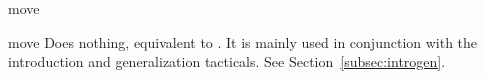 \begin{tactic}[move]{move}
  \begin{tsyntax}[empty]{move}
     Does nothing, equivalent to . It is mainly
     used in conjunction with the introduction and generalization tacticals.
     See Section~\ref{subsec:introgen}.
  \end{tsyntax}
\end{tactic}
